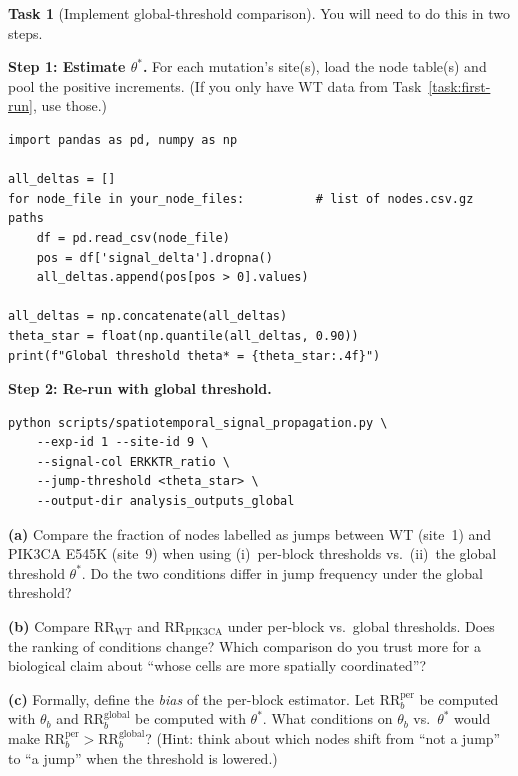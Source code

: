 \documentclass[11pt,a4paper]{article}
\theoremstyle{definition}
\newtheorem{task}{Task}
\newcommand{\RR}{\mathrm{RR}}
\newcommand{\1}[1]{\mathbf{1}\!\left[#1\right]}
\newcommand{\Thr}{\theta}
\begin{document}
\begin{task}[Implement global-threshold comparison]\label{task:global-threshold}
You will need to do this in two steps.

\medskip
\noindent\textbf{Step 1: Estimate $\Thr^*$.}
For each mutation's site(s), load the node table(s) and pool the positive
increments. (If you only have WT data from Task~\ref{task:first-run},
use those.)
\begin{framed}
\begin{verbatim}
import pandas as pd, numpy as np

all_deltas = []
for node_file in your_node_files:          # list of nodes.csv.gz paths
    df = pd.read_csv(node_file)
    pos = df['signal_delta'].dropna()
    all_deltas.append(pos[pos > 0].values)

all_deltas = np.concatenate(all_deltas)
theta_star = float(np.quantile(all_deltas, 0.90))
print(f"Global threshold theta* = {theta_star:.4f}")
\end{verbatim}
\end{framed}

\noindent\textbf{Step 2: Re-run with global threshold.}
\begin{framed}
\begin{verbatim}
python scripts/spatiotemporal_signal_propagation.py \
    --exp-id 1 --site-id 9 \
    --signal-col ERKKTR_ratio \
    --jump-threshold <theta_star> \
    --output-dir analysis_outputs_global
\end{verbatim}
\end{framed}

\noindent\textbf{(a)} Compare the fraction of nodes labelled as jumps between WT
(site~1) and PIK3CA E545K (site~9) when using (i)~per-block thresholds
vs.\ (ii)~the global threshold $\Thr^*$.
Do the two conditions differ in jump frequency under the global threshold?



\noindent\textbf{(b)} Compare $\RR_{\mathrm{WT}}$ and $\RR_{\mathrm{PIK3CA}}$
under per-block vs.\ global thresholds.
Does the ranking of conditions change?
Which comparison do you trust more for a biological claim about
``whose cells are more spatially coordinated''?



\noindent\textbf{(c)} Formally, define the \emph{bias} of the per-block estimator.
Let $\RR_b^{\mathrm{per}}$ be computed with $\Thr_b$ and
$\RR_b^{\mathrm{global}}$ be computed with $\Thr^*$.
What conditions on $\Thr_b$ vs.\ $\Thr^*$ would make
$\RR_b^{\mathrm{per}} > \RR_b^{\mathrm{global}}$?
(Hint: think about which nodes shift from ``not a jump'' to ``a jump''
when the threshold is lowered.)


\end{task}
\end{document}
